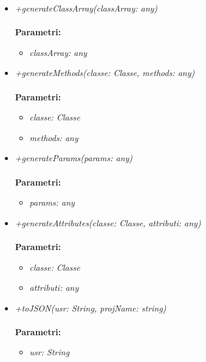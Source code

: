 \begin{itemize}
\begin{itemize}
\begin{itemize}
    		\end{itemize}
    		\item \emph{+generateClassArray(classArray: any)}\\
    		\\
    		\textbf{Parametri:}
    		\begin{itemize}
    			\item \emph{classArray: any}\\
    			
    		\end{itemize}
    		\item \emph{+generateMethods(classe: Classe, methods: any)}\\
    		\\
    		\textbf{Parametri:}
    		\begin{itemize}
    			\item \emph{classe: Classe}\\
    			
    			\item \emph{methods: any}\\
    			
    		\end{itemize}
    		\item \emph{+generateParams(params: any)}\\
    		\\
    		\textbf{Parametri:}
    		\begin{itemize}
    			\item \emph{params: any}\\
    			
    		\end{itemize}
    		\item \emph{+generateAttributes(classe: Classe, attributi: any)}\\
    		\\
    		\textbf{Parametri:}
    		\begin{itemize}
    			\item \emph{classe: Classe}\\
    			
    			\item \emph{attributi: any}\\
    			
    		\end{itemize}
    		\item \emph{+toJSON(usr: String, projName: string)}\\
    		\\
    		\textbf{Parametri:}
    		\begin{itemize}
    			\item \emph{usr: String}\\
    			

\end{itemize}
\end{itemize}
\end{itemize}
